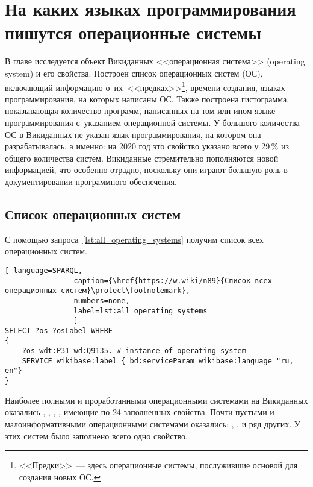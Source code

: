 \chapter{На каких языках программирования пишутся операционные системы}
\label{ch:operating-sysmets}

В главе исследуется объект Викиданных <<операционная система>> (operating system) и его свойства. 
Построен список операционных систем (ОС), включающий информацию о~их~<<предках>>\footnote{%
%
<<Предки>>~--- здесь операционные системы, послужившие основой для создания новых ОС.%
%
}, 
времени создания, языках программирования, на которых написаны ОС. 
Также построена гистограмма, показывающая количество программ, 
написанных на том или ином языке программирования с~указанием операционной системы. 
У большого количества ОС в Викиданных не указан язык программирования, 
на котором она разрабатывалась, а именно: 
на 2020 год это свойство указано всего у 29\,\% из общего количества систем. 
Викиданные стремительно пополняются новой информацией, что особенно отрадно, 
поскольку они играют большую роль в документировании программного обеспечения.



\section{Список операционных систем}
С помощью запроса~\ref{lst:all_operating_systems} получим список всех операционных систем.
\begin{lstlisting}[ language=SPARQL, 
                caption={\href{https://w.wiki/n89}{Список всех операционных систем}\protect\footnotemark},
                numbers=none,
                label=lst:all_operating_systems
	            ]
SELECT ?os ?osLabel WHERE
{
    ?os wdt:P31 wd:Q9135. # instance of operating system
    SERVICE wikibase:label { bd:serviceParam wikibase:language "ru, en"}
}
\end{lstlisting}


\newpage
Наиболее полными и проработанными операционными системами на Викиданных оказались 
, 
, 
, 
, имеющие по 24 заполненных свойства\autocite{prowd_os_link}.
Почти пустыми и малоинформативными операционными системами оказались: 
, ,  и ряд других. 
У этих систем было заполнено всего одно свойство\autocite{prowd_os_link}.

